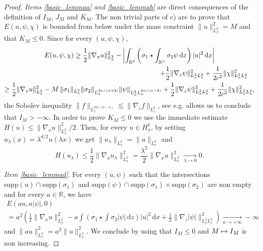 \documentclass[11pt]{article}
\newcommand\mto{\mathchoice{\longmapsto}{\mapsto}{\mapsto}{\mapsto}}
\theoremstyle{definition}
\newcommand{\R}{\mathbb{R}}
\newcommand{\ud}{\, {\mathrm{d}}}
\begin{document}
\begin{proof}
\textit{Items \eqref{basic_lemmaa} and \eqref{basic_lemmab}} are direct consequences of the definition of $I_{M}$, $J_{M}$ and $K_{M}$. The non trivial parts of c) are to prove that $E(u,\psi,\chi)$ is bounded from below under the mass constraint $\|u\|_{L_{x}^{2}}^{2}=M$ and that $K_{M}\leq 0$. Since for every $(u,\psi,\chi)$,\vspace*{-5pt}
\bgroup
{}
\begin{multline}\label{gradient_borne}
E(u,\psi,\chi)\geq\frac{1}{2}\|\nabla_{x}u\|_{L_{x}^{2}}^{2}-\left|\int_{\R^{d}}\left(\sigma_{1}\star\int_{\R^{n}}\sigma_{2}\psi\ud z\right)|u|^{2}\ud x\right| \\
\shoveright{+\frac{1}{2}\|\nabla_{z}\psi\|_{L_{x}^{2}L_{z}^{2}}^{2}+\frac{1}{2c^{2}}\|\chi\|_{L_{x}^{2}L_{z}^{2}}^{2}}\\
\geq\frac{1}{2}\|\nabla_{x}u\|_{L_{x}^{2}}^{2}-M\,\|\sigma_{1}\|_{L_{x}^{2}}\|\sigma_{2}\|_{L_{z}^{2n/(n+2)}}\|\psi\|_{L_{x}^{2}L_{z}^{2n/(n-2)}}
+\frac{1}{2}\|\nabla_{z}\psi\|_{L_{x}^{2}L_{z}^{2}}^{2}+\frac{1}{2c^{2}}\|\chi\|_{L_{x}^{2}L_{z}^{2}}^{2},
\end{multline}
\egroup
the Sobolev inequality $\|f\|_{L_{z}^{2n/(n-2)}}\lesssim\|\nabla_{z}f\|_{L_{z}^{2}}$, see e.g. \cite[Th., p.\,125]{Nir} allows us to conclude that $I_{M}>-\infty$. In order to prove $K_{M}\leq 0$ we use the immediate estimate $H(u)\leq \|\nabla_{x}u\|_{L_{x}^{2}}^{2}/2$. Then, for every $u\in H_{x}^{1}$, by setting $u_{\lambda}(x)=\lambda^{d/2}u(\lambda x)$ we get $\|u_{\lambda}\|_{L_{x}^{2}}=\|u\|_{L_{x}^{2}}$ and
\[
H(u_{\lambda})\leq\frac{1}{2}\|\nabla_{x}u_{\lambda}\|_{L_{x}^{2}}^{2}=\frac{\lambda^{2}}{2}\|\nabla_{x}u\|_{L_{x}^{2}}^{2}\underset{\lambda\to 0}{\to}0.
\]

\textit{Item \eqref{basic_lemmad}}. For every $(u,\psi)$ such that the intersections $\mathrm{supp}(u)\cap\mathrm{supp}(\sigma_{1})$ and $\mathrm{supp}(\psi)\cap\mathrm{supp}(\sigma_{1})\times\mathrm{supp}(\sigma_{2})$ are non empty and for every $a\in\R$, we have
\begin{multline*}
E(au,a|\psi|,0)
\\
= a^{2}\left(\frac{1}{2}\|\nabla_{x}u\|_{L_{x}^{2}}^{2}-a\int\left(\sigma_{1}\star\int\sigma_{2}|\psi|\ud z\right)|u|^{2}\ud x+\frac{1}{2}\|\nabla_{z}|\psi|\|_{L_{x}^{2}L_{z}^{2}}^{2}\right)\underset{a\to+\infty}{\to}-\infty
\end{multline*}
and $\|au\|_{L_{x}^{2}}^{2}=a^{2}\|u\|_{L_{x}^{2}}^{2}$. We conclude by using that $I_{M}\leq 0$ and $M\mto I_{M}$ is non increasing.


\end{proof}
\end{document}
